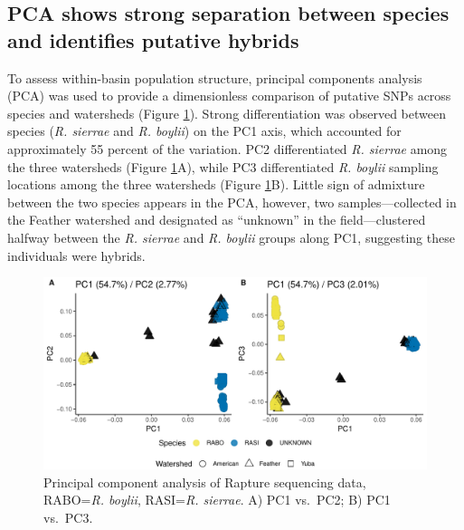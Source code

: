 \documentclass[proquest,12pt,final]{ucthesis-CA2012} %
\begin{document}
\begin{ucmainmatter}
\hypertarget{pca-shows-strong-separation-between-species-and-identifies-putative-hybrids}{%
\subsection{PCA shows strong separation between species and identifies
putative
hybrids}\label{pca-shows-strong-separation-between-species-and-identifies-putative-hybrids}}

To assess within-basin population structure, principal components
analysis (PCA) was used to provide a dimensionless comparison of
putative SNPs across species and watersheds (Figure \ref{fig:CH2F2pca}).
Strong differentiation was observed between species (\emph{R. sierrae}
and \emph{R. boylii}) on the PC1 axis, which accounted for approximately
55 percent of the variation. PC2 differentiated \emph{R. sierrae} among
the three watersheds (Figure \ref{fig:CH2F2pca}A), while PC3
differentiated \emph{R. boylii} sampling locations among the three
watersheds (Figure \ref{fig:CH2F2pca}B). Little sign of admixture
between the two species appears in the PCA, however, two
samples---collected in the Feather watershed and designated as
``unknown'' in the field---clustered halfway between the \emph{R.
sierrae} and \emph{R. boylii} groups along PC1, suggesting these
individuals were hybrids.




\begin{figure}

{\centering \includegraphics[width=0.95\linewidth]{figure/ch2/figure_02_pca_rasi_all_25k_combined} 

}

\caption{Principal component analysis of Rapture sequencing data,
RABO=\emph{R. boylii}, RASI=\emph{R. sierrae}. A) PC1 vs.~PC2; B) PC1
vs.~PC3.}\label{fig:CH2F2pca}
\end{figure}
\clearpage


\end{ucmainmatter}
\end{document}
